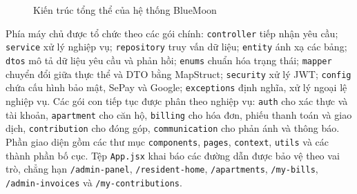 ﻿\documentclass[12pt,a4paper]{report}
\newcommand{\projectname}{BlueMoon}
\begin{document}
\begin{figure}[H]
{}
\caption{Kiến trúc tổng thể của hệ thống \projectname}
\end{figure}

Phía máy chủ được tổ chức theo các gói chính: \texttt{controller} tiếp nhận yêu cầu; \texttt{service} xử lý nghiệp vụ; \texttt{repository} truy vấn dữ liệu; \texttt{entity} ánh xạ các bảng; \texttt{dtos} mô tả dữ liệu yêu cầu và phản hồi; \texttt{enums} chuẩn hóa trạng thái; \texttt{mapper} chuyển đổi giữa thực thể và DTO bằng MapStruct; \texttt{security} xử lý JWT; \texttt{config} chứa cấu hình bảo mật, SePay và Google; \texttt{exceptions} định nghĩa, xử lý ngoại lệ nghiệp vụ. Các gói con tiếp tục được phân theo nghiệp vụ: \texttt{auth} cho xác thực và tài khoản, \texttt{apartment} cho căn hộ, \texttt{billing} cho hóa đơn, phiếu thanh toán và giao dịch, \texttt{contribution} cho đóng góp, \texttt{communication} cho phản ánh và thông báo. Phần giao diện gồm các thư mục \texttt{components}, \texttt{pages}, \texttt{context}, \texttt{utils} và các thành phần bố cục. Tệp \texttt{App.jsx} khai báo các đường dẫn được bảo vệ theo vai trò, chẳng hạn \texttt{/admin-panel}, \texttt{/resident-home}, \texttt{/apartments}, \texttt{/my-bills}, \texttt{/admin-invoices} và \texttt{/my-contributions}.
\end{document}
